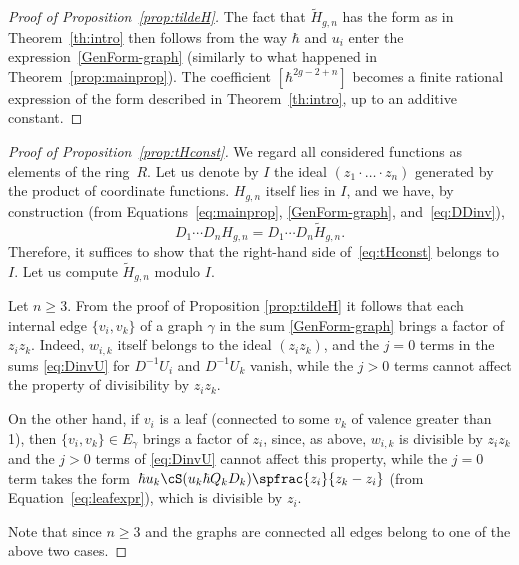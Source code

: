 \begin{proof}[Proof of Proposition~\ref{prop:tildeH}]
The fact that $\widetilde H_{g,n}$ has the form as in Theorem~\ref{th:intro} then follows from the way $\hbar$ and $u_i$ enter the expression~\eqref{GenForm-graph} (similarly to what happened in Theorem~\ref{prop:mainprop}). The coefficient $[\hbar^{2g-2+n}]$ becomes a finite rational expression of the form described in Theorem~\ref{th:intro}, up to an additive constant.
\end{proof}

\begin{proof}[Proof of Proposition~\ref{prop:tHconst}]
We regard all considered functions as elements of the ring~$R$.
Let us denote by $I$ the ideal $(z_1\cdot\ldots\cdot z_n)$ generated by the product of coordinate functions.
$H_{g,n}$ itself lies in $I$, and we have, by construction (from Equations~\eqref{eq:mainprop}, \eqref{GenForm-graph}, and~\eqref{eq:DDinv}),
\begin{equation*}
D_1\cdots D_n H_{g,n}=D_1\cdots D_n \widetilde H_{g,n}.
\end{equation*}
Therefore, it suffices to show that the right-hand side of~\eqref{eq:tHconst} belongs to~$I$.
Let us compute $\widetilde{H}_{g,n}$ modulo $I$.

Let $n\geq 3$.
From the proof of Proposition \ref{prop:tildeH} it follows that each internal edge $\{v_i,v_k\}$ of a graph $\gamma$ in the sum \eqref{GenForm-graph} brings a factor of $z_i z_k$. Indeed, $w_{i,k}$ itself belongs to the ideal $(z_iz_k)$, and the $j=0$ terms in the sums \eqref{eq:DinvU} for $D^{-1}U_i$ and $D^{-1}U_k$ vanish, while the $j>0$ terms cannot affect the property of divisibility by $z_i z_k$.

On the other hand, if $v_i$ is a leaf (connected to some $v_k$ of valence greater than 1),
then $\{v_i,v_k\}\in E_\gamma$ brings a factor of $z_i$, since, as above, $w_{i,k}$ is divisible by $z_iz_k$ and the $j>0$ terms of \eqref{eq:DinvU} cannot affect this property, while the $j=0$ term takes the form~$\hbar u_k \cS(u_k\hbar Q_kD_k)\spfrac{z_i}{z_k-z_i}$ (from Equation~\eqref{eq:leafexpr}), which is divisible by $z_i$.

Note that since $n\geq 3$ and the graphs are connected all edges belong to one of the above two cases.


\end{proof}
